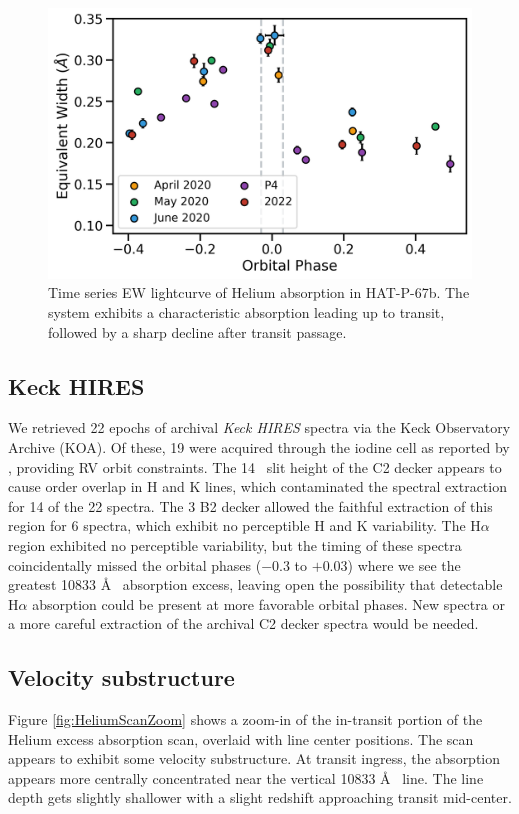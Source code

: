 \documentclass[twocolumn]{aastex631}
\begin{document}
\begin{figure}
    \includegraphics[width=\linewidth]{figures/HAT_P_67b_Helium10830EW_byCampaign.png}
    \caption{Time series EW lightcurve of Helium absorption in HAT-P-67b.  The system exhibits a characteristic absorption leading up to transit, followed by a sharp decline after transit passage.  }
    \label{fig:HPFtimeseries}
\end{figure}



\subsection{Keck HIRES}
We retrieved 22 epochs of archival \emph{Keck HIRES} spectra via the Keck Observatory Archive (KOA). Of these, 19 were acquired through the iodine cell as reported by \citet{2017AJ....153..211Z}, providing RV orbit constraints.  The 14\arcsec~ slit height of the C2 decker appears to cause order overlap in  H and K lines, which contaminated the spectral extraction for 14 of the 22 spectra.  The 3 B2 decker allowed the faithful extraction of this region for 6 spectra, which exhibit no perceptible  H and K variability.  The H$\alpha$ region exhibited no perceptible variability, but the timing of these spectra coincidentally missed the orbital phases ($-0.3$ to $+0.03$) where we see the greatest  10833 \AA~ absorption excess, leaving open the possibility that detectable H$\alpha$ absorption could be present at more favorable orbital phases.  New spectra or a more careful extraction of the archival C2 decker spectra would be needed.


\subsection{Velocity substructure}
Figure \ref{fig:HeliumScanZoom} shows a zoom-in of the in-transit portion of the Helium excess absorption scan, overlaid with line center positions.  The scan appears to exhibit some velocity substructure.  At transit ingress, the absorption appears more centrally concentrated near the vertical 10833 \AA~ line.  The line depth gets slightly shallower with a slight redshift approaching transit mid-center. 
\end{document}
